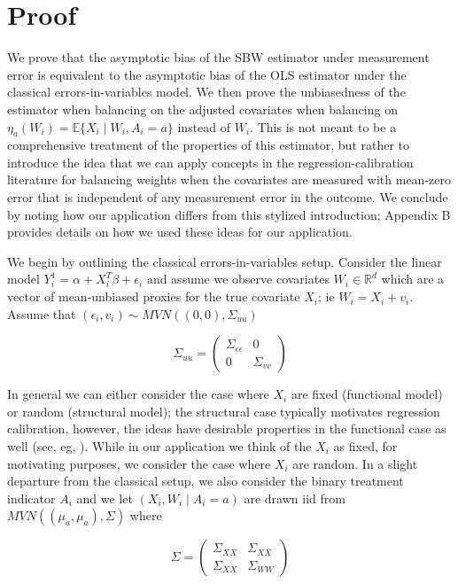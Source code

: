 \documentclass[12pt]{article}
\begin{document}
\section{Proof}

We prove that the asymptotic bias of the SBW estimator under measurement error is equivalent to the asymptotic bias of the OLS estimator under the classical errors-in-variables model. We then prove the unbiasedness of the estimator when balancing on the adjusted covariates when balancing on $\eta_a(W_i) = \mathbb{E}\{X_i \mid W_i, A_i = a\}$ instead of $W_i$. This is not meant to be a comprehensive treatment of the properties of this estimator, but rather to introduce the idea that we can apply concepts in the regression-calibration literature for balancing weights when the covariates are measured with mean-zero error that is independent of any measurement error in the outcome. We conclude by noting how our application differs from this stylized introduction; Appendix B provides details on how we used these ideas for our application.

We begin by outlining the classical errors-in-variables setup. Consider the linear model $Y_i^1 = \alpha + X_i^T\beta + \epsilon_i$ and assume we observe covariates $W_i \in \mathbb{R}^d$ which are a vector of mean-unbiased proxies for the true covariate $X_i$; ie $W_i = X_i + v_i$. Assume that $(\epsilon_i, v_i) \sim MVN((0,0), \Sigma_{uu})$ 

$$
\Sigma_{uu} = \begin{pmatrix} 
\Sigma_{\epsilon\epsilon} & 0 \\ 
0 & \Sigma_{vv} 
\end{pmatrix}
$$ 

In general we can either consider the case where $X_i$ are fixed (functional model) or random (structural model); the structural case typically motivates regression calibration, however, the ideas have desirable properties in the functional case as well (see, eg, \cite{gleser1992importance}). While in our application we think of the $X_i$ as fixed, for motivating purposes, we consider the case where $X_i$ are random. In a slight departure from the classical setup, we also consider the binary treatment indicator $A_i$ and we let $(X_i, W_i \mid A_i = a)$ are drawn iid from $MVN((\mu_a, \mu_a), \Sigma)$ where 

$$
\Sigma = \begin{pmatrix} 
\Sigma_{XX} & \Sigma_{XX} \\ 
\Sigma_{XX} & \Sigma_{WW}  
\end{pmatrix}
$$ 
\end{document}
